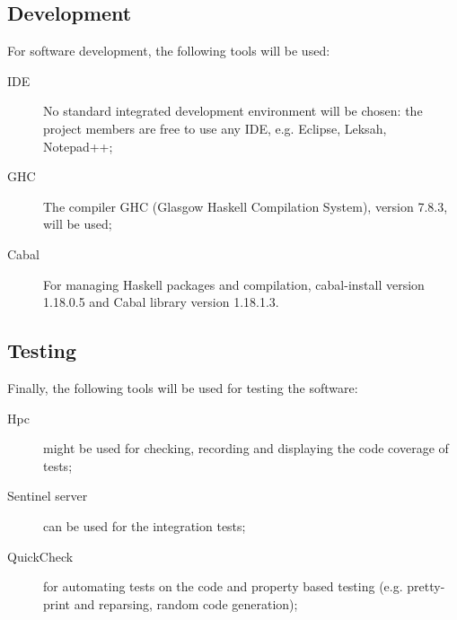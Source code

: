 \subsection{Development}
%
%
%
For software development, the following tools will be used:
\begin{description}
	\item[IDE] No standard integrated development environment will be chosen: the project members are free to use any IDE, e.g. Eclipse, Leksah, Notepad++;
	\item[GHC] The compiler GHC (Glasgow Haskell Compilation System), version 7.8.3, will be used;
	\item[Cabal] For managing Haskell packages and compilation, cabal-install version 1.18.0.5 and Cabal library version 1.18.1.3.
\end{description}

\subsection{Testing}
%
%
%
Finally, the following tools will be used for testing the software:
\begin{description}
	\item[Hpc] might be used for checking, recording and displaying the code coverage of tests;
	\item[Sentinel server] can be used for the integration tests;
	\item[QuickCheck] for automating tests on the code and property based testing (e.g. pretty-print and reparsing, random code generation);
\end{description}
